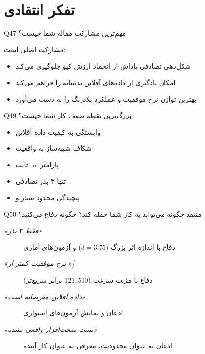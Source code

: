 \documentclass[oneside,openany,a4paper,12pt]{article}
\newcommand{\rsdrl}{\lr{RS-DRL}}
\begin{document}
\section{تفکر انتقادی}

\begin{questionbox}{Q47}
مهم‌ترین مشارکت مقاله شما چیست؟
\end{questionbox}

\begin{hintbox}
\textbf{\rsdrl{}} مشارکت اصلی است:
\begin{itemize}
  \item شکل‌دهی تصادفی پاداش از انجماد ارزش کیو جلوگیری می‌کند
  \item امکان یادگیری از داده‌های آفلاین بدبینانه را فراهم می‌کند
  \item بهترین توازن نرخ موفقیت و عملکرد بلادرنگ را به دست می‌آورد
\end{itemize}
\end{hintbox}

\begin{questionbox}{Q49}
بزرگ‌ترین نقطه ضعف کار شما چیست؟
\end{questionbox}

\begin{hintbox}
\begin{itemize}
  \item وابستگی به کیفیت داده آفلاین
  \item شکاف شبیه‌ساز به واقعیت
  \item پارامتر $\varrho$ ثابت
  \item تنها ۳ بذر تصادفی
  \item پیچیدگی محدود سناریو
\end{itemize}
\end{hintbox}

\begin{questionbox}{Q50}
منتقد چگونه می‌تواند به کار شما حمله کند؟ چگونه دفاع می‌کنید؟
\end{questionbox}

\begin{hintbox}
\begin{description}
  \item[\textit{«فقط ۳ بذر»}] دفاع با اندازه اثر بزرگ ($d=3.75$) و آزمون‌های آماری
  \item[\textit{«نرخ موفقیت کمتر از }»\textit{]}] دفاع با مزیت سرعت ($121{,}500$ برابر سریع‌تر)
  \item[\textit{«داده آفلاین مغرضانه است»}] اذعان و نمایش آزمون‌های استواری
  \item[\textit{«تست سخت‌افزار واقعی نشده»}] اذعان به عنوان محدودیت، معرفی به عنوان کار آینده
\end{description}
\end{hintbox}
\end{document}
